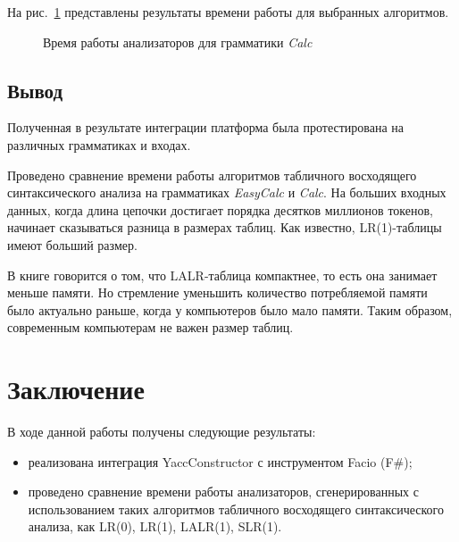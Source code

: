 \documentclass[14pt]{matmex-diploma}
\begin{document}
На рис.~\ref{Calc} представлены результаты времени работы для выбранных алгоритмов.

\begin{figure}[h]
  \caption{Время работы анализаторов для грамматики \textit{Calc}}
  \label{Calc}
  \centering
\end{figure}

\subsection{Вывод}

Полученная в результате интеграции платформа была протестирована на различных грамматиках и входах.

Проведено сравнение времени работы алгоритмов табличного восходящего синтаксического анализа на грамматиках \textit{EasyCalc} и \textit{Calc}. На больших входных данных, когда длина цепочки достигает порядка десятков миллионов токенов, начинает сказываться разница в размерах таблиц. Как известно, LR(1)-таблицы имеют больший размер.

В книге \cite{book:compilles} говорится о том, что LALR-таблица компактнее, то есть она занимает меньше памяти. Но стремление уменьшить количество потребляемой памяти было актуально раньше, когда у компьютеров было мало памяти.
Таким образом, современным компьютерам не важен размер таблиц.



\section*{Заключение}
В ходе данной работы получены следующие результаты:
\begin{itemize}
\item
реализована интеграция YaccConstructor с инструментом Facio (F\#);
\item
проведено сравнение времени работы анализаторов, сгенерированных с использованием таких алгоритмов табличного восходящего синтаксического анализа, как LR(0), LR(1), LALR(1), SLR(1).
\end{itemize}
\end{document}
